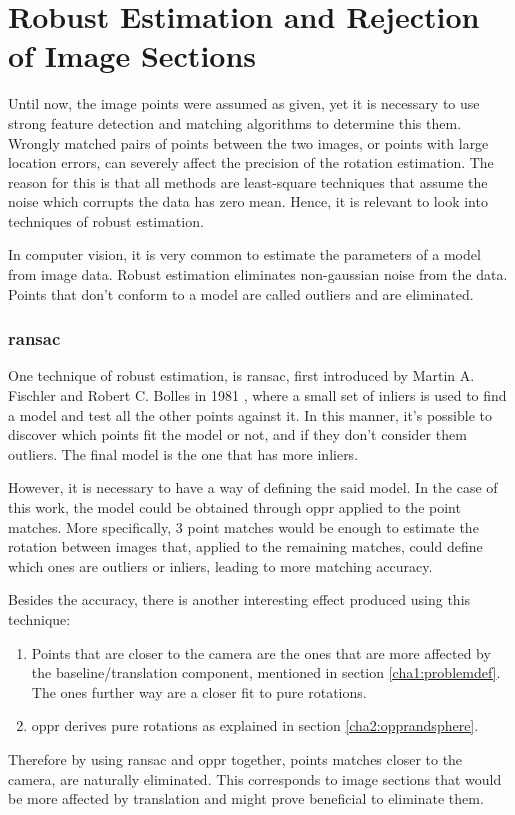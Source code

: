 
\section{Robust Estimation and Rejection of Image Sections}
\label{cha2:robustest}

Until now, the image points were assumed as given, yet it is necessary to use strong feature detection and matching algorithms to determine this them. Wrongly matched pairs of points between the two images, or points with large location errors, can severely affect the precision of the rotation estimation. The reason for this is that all methods are least-square techniques that assume the noise which corrupts the data has zero mean. Hence, it is relevant to look into techniques of robust estimation.

In computer vision, it is very common to estimate the parameters of a model from image data. Robust estimation eliminates non-gaussian noise from the data. Points that don’t conform to a model are called outliers and are eliminated.

\subsubsection{\acrlong{ransac}}

One technique of robust estimation, is \acrfull{ransac}, first introduced by Martin A. Fischler and Robert C. Bolles in 1981 \cite{ransac}, where a small set of inliers is used to find a model and test all the 
other points against it. In this manner, it's possible to discover which points fit the model or not, and if they don’t consider them outliers. The final model is the one that has more inliers. 

However, it is necessary to have a way of defining the said model. In the case of this work, the model could be obtained through \acrlong{oppr} applied to the point matches. More specifically, 3 point matches would be enough to estimate the rotation between images that, applied to the remaining matches, could define which ones are outliers or inliers, leading to more matching accuracy.

Besides the accuracy, there is another interesting effect produced using this technique:

\begin{enumerate}
\item Points that are closer to the camera are the ones that are more affected by the baseline/translation component, mentioned in section \ref{cha1:problemdef}. The ones further way are a closer fit to pure rotations.

\item \acrshort{oppr} derives pure rotations as explained in section \ref{cha2:opprandsphere}. 
\end{enumerate}
Therefore by using \acrshort{ransac} and \acrshort{oppr} together, points matches closer to the camera, are naturally eliminated. This corresponds to image sections that would be more affected by translation and might prove beneficial to eliminate them. \cite{mono} 

